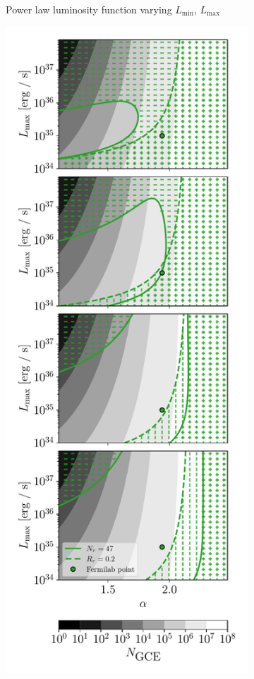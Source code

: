 \documentclass[a4paper,11pt]{article}
\begin{document}
\begin{figure}
\begin{subfigure}[b]{0.32\textwidth}
        \caption{Power law luminosity function varying $L_\text{min}$, $L_\text{max}$}
    \end{subfigure}
    \hfill
    \begin{subfigure}[b]{0.32\textwidth}
        \includegraphics[width=\textwidth]{figs/power-law-alpha-sensitivity.pdf}

\end{subfigure}
\end{figure}
\end{document}
